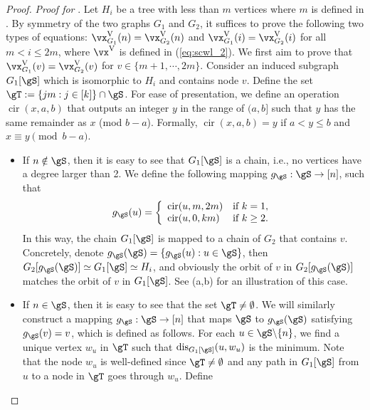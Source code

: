 \documentclass{article} %
\let\cref\crtcref
\newcommand*{\dis}{{\operatorname{dis}}}
\begin{document}
\begin{proof}
\emph{Proof for \cref{example:1}}. Let $H_i$ be a tree with less than $m$ vertices where $m$ is defined in \cref{example:1}. By symmetry of the two graphs $G_1$ and $G_2$, it suffices to prove the following two types of equations: $\vx_{G_1}^\mathrm{V}(n)=\vx_{G_2}^\mathrm{V}(n)$ and $\vx_{G_1}^\mathrm{V}(i)=\vx_{G_2}^\mathrm{V}(i)$ for all $m<i\le 2m$, where $\vx^\mathrm{V}$ is defined in (\ref{eq:scwl_2}). We first aim to prove that $\vx_{G_1}^\mathrm{V}(v)=\vx_{G_2}^\mathrm{V}(v)$ for $v\in\{m+1,\cdots,2m\}$. Consider an induced subgraph $G_1[\gS]$ which is isomorphic to $H_i$ and contains node $v$. Define the set $\gT:=\{jm:j\in[k]\}\cap \gS$. For ease of presentation, we define an operation $\operatorname{cir}(x,a,b)$ that outputs an integer $y$ in the range of $(a,b]$ such that $y$ has the same remainder as $x$ (mod $b-a$). Formally, $\operatorname{cir}(x,a,b)=y$ if $a<y\le b$ and $x\equiv y\pmod{ b-a}$.
\begin{itemize}[topsep=0pt,leftmargin=30pt]
\setlength{\itemsep}{0pt}
    \item If $n\notin\gS$, then it is easy to see that $G_1[\gS]$ is a chain, i.e., no vertices have a degree larger than 2. We define the following mapping $g_\gS:\gS\to [n]$, such that
    \begin{equation*}
        g_\gS(u)=\left\{\begin{array}{ll}
            \operatorname{cir}(u,m,2m) & \text{if }k=1, \\
            \operatorname{cir}(u,0,km) & \text{if }k\ge 2.
        \end{array}\right.
    \end{equation*}
    In this way, the chain $G_1[\gS]$ is mapped to a chain of $G_2$ that contains $v$. Concretely, denote $g_\gS(\gS)=\{g_\gS(u):u\in\gS\}$, then $G_2[g_\gS(\gS)]\simeq G_1[\gS]\simeq H_i$, and obviously the orbit of $v$ in $G_2[g_\gS(\gS)]$ matches the orbit of $v$ in $G_1[\gS]$. See \cref{fig:proof_scwl}(a,b) for an illustration of this case.
    \item If $n\in\gS$, then it is easy to see that the set $\gT\neq \emptyset$. We will similarly construct a mapping $g_\gS:\gS\to [n]$ that maps $\gS$ to $g_\gS(\gS)$ satisfying $g_\gS(v)=v$, which is defined as follows. For each $u\in\gS\backslash\{n\}$, we find a unique vertex $w_u$ in $\gT$ such that $\dis_{G_1[\gS]}(u,w_u)$ is the minimum. Note that the node $w_u$ is well-defined since $\gT\neq\emptyset$ and any path in $G_1[\gS]$ from $u$ to a node in $\gT$ goes through $w_u$. Define
    \begin{equation*}

\end{equation*}
\end{itemize}
\end{proof}
\end{document}
